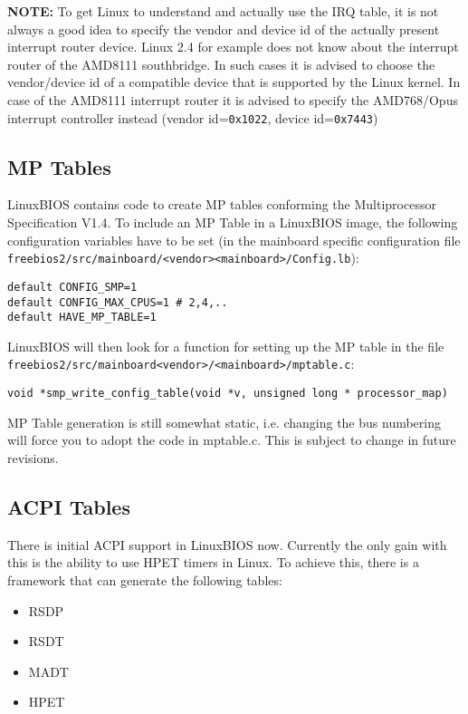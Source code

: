 \documentclass[titlepage,12pt]{article}
\begin{document}
\textbf{NOTE:} To get Linux to understand and actually use the IRQ
table, it is not always a good idea to specify the vendor and device id
of the actually present interrupt router device. Linux 2.4 for example
does not know about the interrupt router of the AMD8111 southbridge. In
such cases it is advised to choose the vendor/device id of a compatible
device that is supported by the Linux kernel. In case of the AMD8111
interrupt router it is advised to specify the AMD768/Opus interrupt
controller instead (vendor id=\texttt{0x1022}, device id=\texttt{0x7443})

\subsection {MP Tables}

LinuxBIOS contains code to create MP tables conforming the
Multiprocessor Specification V1.4. To include an MP Table in a LinuxBIOS
image, the following configuration variables have to be set (in the
mainboard specific configuration file
\texttt{freebios2/src/mainboard/<vendor><mainboard>/Config.lb}):

\begin{verbatim}
default CONFIG_SMP=1
default CONFIG_MAX_CPUS=1 # 2,4,..
default HAVE_MP_TABLE=1
\end{verbatim}

LinuxBIOS will then look for a function for setting up the MP table in
the file \texttt{freebios2/src/mainboard<vendor>/<mainboard>/mptable.c}:

\begin{verbatim}
void *smp_write_config_table(void *v, unsigned long * processor_map)
\end{verbatim}

MP Table generation is still somewhat static, i.e. changing the bus
numbering will force
you to adopt the code in mptable.c. This is subject to change in future
revisions.

\subsection {ACPI Tables}

There is initial ACPI support in LinuxBIOS now. Currently the only gain with
this is the ability to use HPET timers in Linux. To achieve this, there is a
framework that can generate the following tables: 
\begin{itemize}
\item RSDP
\item RSDT
\item MADT
\item HPET
\end{itemize}
\end{document}
